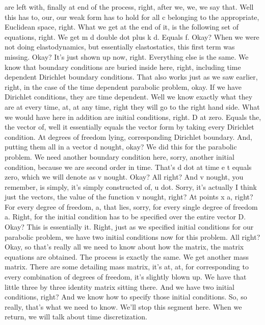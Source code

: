 \documentclass[10pt]{article}
\begin{document}
are left with, finally at end of the process, right, after we, we, we say that. Well this has to, our, our weak form has to hold for all c belonging to the appropriate, Euclidean space, right. What we get at the end of it, is the following set of equations, right. We get m d double dot plus k d. Equals f. Okay? When we were not doing elastodynamics, but essentially elastostatics, this first term was missing. Okay? It's just shown up now, right. Everything else is the same. We know that boundary conditions are buried inside here, right, including time dependent Dirichlet boundary conditions. That also works just as we saw earlier, right, in the case of the time dependent parabolic problem, okay. If we have Dirichlet conditions, they are time dependent. Well we know exactly what they are at every time, at, at any time, right they will go to the right hand side. What we would have here in addition are initial conditions, right. D at zero. Equals the, the vector of, well it essentially equals the vector form by taking every Dirichlet condition. At degrees of freedom lying, corresponding Dirichlet boundary. And, putting them all in a vector d nought, okay? We did this for the parabolic problem. We need another boundary condition here, sorry, another initial condition, because we are second order in time. That's d dot at time e t equals zero, which we will denote as v nought. Okay? All right? And v nought, you remember, is simply, it's simply constructed of, u dot. Sorry, it's actually I think just the vectors, the value of the function v nought, right? At points x a, right? For every degree of freedom, a, that lies, sorry, for every single degree of freedom a. Right, for the initial condition has to be specified over the entire vector D. Okay? This is essentially it. Right, just as we specified initial conditions for our parabolic problem, we have two initial conditions now for this problem. All right? Okay, so that's really all we need to know about how the matrix, the matrix equations are obtained. The process is exactly the same. We get another mass matrix. There are some detailing mass matrix, it's at, at, for corresponding to every combination of degrees of freedom, it's slightly blown up. We have that little three by three identity matrix sitting there. And we have two initial conditions, right? And we know how to specify those initial conditions. So, so really, that's what we need to know. We'll stop this segment here. When we return, we will talk about time discretization.
\end{document}

